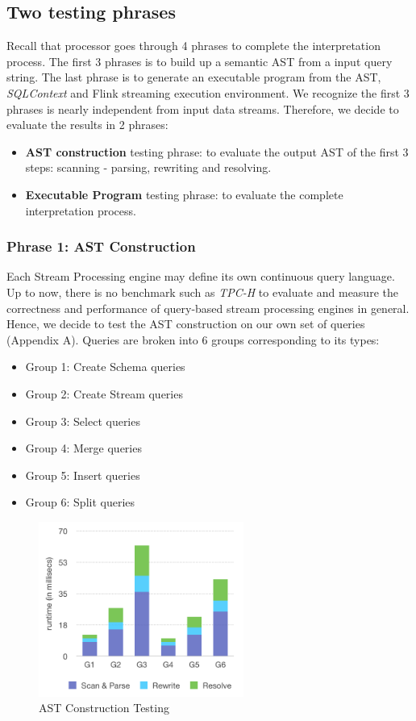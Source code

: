 \subsection{Two testing phrases}
Recall that processor goes through 4 phrases to complete the interpretation process. The first 3 phrases is to build up a semantic AST from a input query string. The last phrase is to generate an executable program from the AST,  \textit{SQLContext} and Flink streaming execution environment. We recognize the first 3 phrases is nearly independent from input data streams.  Therefore, we decide to evaluate the results in 2 phrases:

\begin{itemize}
	\item \textbf{AST construction} testing phrase: to evaluate the output AST of the first 3 steps: scanning -  parsing, rewriting and resolving.
	\item \textbf{Executable Program} testing phrase: to evaluate the complete interpretation process.
\end{itemize}

\subsubsection{Phrase 1: AST Construction}
Each Stream Processing engine may define its own continuous query language. Up to now, there is no benchmark such as \textit{TPC-H} to evaluate and measure the correctness and performance of query-based stream processing engines in general. 
Hence, we decide to test the AST construction on our own set of queries (Appendix A). Queries are broken into 6 groups corresponding to its types: 
\begin{itemize}
	\item Group 1: Create Schema queries
	\item Group 2: Create Stream queries
	\item Group 3: Select queries
	\item Group 4: Merge queries
	\item Group 5: Insert queries
	\item Group 6: Split queries
\end{itemize} 

\begin{figure}[h!] 
\centering    
\includegraphics[width=0.6\textwidth]{ASTConstruction}
\caption{AST Construction Testing}
\label{fig:ASTConstruction}
\end{figure}

